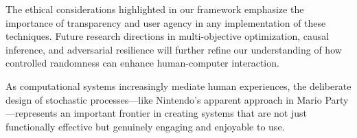 \documentclass{article}
\begin{document}
The ethical considerations highlighted in our framework emphasize the importance of transparency and user agency in any implementation of these techniques. Future research directions in multi-objective optimization, causal inference, and adversarial resilience will further refine our understanding of how controlled randomness can enhance human-computer interaction.

As computational systems increasingly mediate human experiences, the deliberate design of stochastic processes—like Nintendo's apparent approach in Mario Party—represents an important frontier in creating systems that are not just functionally effective but genuinely engaging and enjoyable to use.
\end{document}
